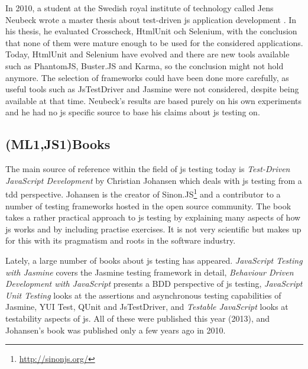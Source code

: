 \documentclass[11pt]{article}
\begin{document}
In 2010, a student at the Swedish royal institute of technology called Jens Neubeck wrote a master thesis about test-driven \gls{js} application development \cite{Neubeck}. In his thesis, he evaluated Crosscheck, HtmlUnit och Selenium, with the conclusion that none of them were mature enough to be used for the considered applications. Today, HtmlUnit and Selenium have evolved and there are new tools available such as PhantomJS, Buster.JS and Karma, so the conclusion might not hold anymore. The selection of frameworks could have been done more carefully, as useful tools such as JsTestDriver and Jasmine were not considered, despite being available at that time. Neubeck's results are based purely on his own experiments and he had no \gls{js} specific source to base his claims about \gls{js} testing on.

\subsection{(ML1,JS1)Books}

The main source of reference within the field of \gls{js} testing today is \emph{Test-Driven JavaScript Development} \cite{Tddjs} by Christian Johansen which deals with \gls{js} testing from a \gls{tdd} perspective. Johansen is the creator of Sinon.JS\footnote{\url{http://sinonjs.org/}} and a contributor to a number of testing frameworks hosted in the open source community. The book takes a rather practical approach to \gls{js} testing by explaining many aspects of how \gls{js} works and by including practise exercises. It is not very scientific but makes up for this with its pragmatism and roots in the software industry.

Lately, a large number of books about \gls{js} testing has appeared. \emph{JavaScript Testing with Jasmine} \cite{JasmineBook} covers the Jasmine testing framework in detail, \emph{Behaviour Driven Development with JavaScript} \cite{BDDJS} presents a BDD perspective of \gls{js} testing, \emph{JavaScript Unit Testing} \cite{JSUT} looks at the assertions and asynchronous testing capabilities of Jasmine, YUI Test, QUnit and JsTestDriver, and \emph{Testable JavaScript} \cite{TestableJS} looks at testability aspects of \gls{js}. All of these were published this year (2013), and Johansen's book was published only a few years ago in 2010.
\end{document}

